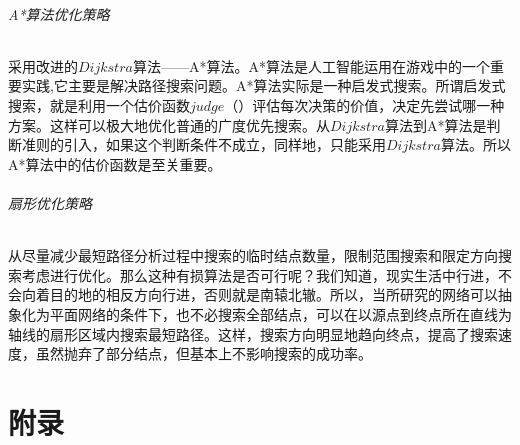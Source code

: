 \documentclass[a4paper,10pt]{ctexart}
\begin{document}
\paragraph{A*算法优化策略}
采用改进的$Dijkstra$算法——A*算法。A*算法是人工智能运用在游戏中的一个重要实践,它主要是解决路径搜索问题。A*算法实际是一种启发式搜索。所谓启发式搜索，就是利用一个估价函数$judge（）$评估每次决策的价值，决定先尝试哪一种方案。这样可以极大地优化普通的广度优先搜索。从$Dijkstra$算法到A*算法是判断准则的引入，如果这个判断条件不成立，同样地，只能采用$Dijkstra$算法。所以A*算法中的估价函数是至关重要。
\paragraph{扇形优化策略}
从尽量减少最短路径分析过程中搜索的临时结点数量，限制范围搜索和限定方向搜索考虑进行优化。那么这种有损算法是否可行呢？我们知道，现实生活中行进，不会向着目的地的相反方向行进，否则就是南辕北辙。所以，当所研究的网络可以抽象化为平面网络的条件下，也不必搜索全部结点，可以在以源点到终点所在直线为轴线的扇形区域内搜索最短路径。这样，搜索方向明显地趋向终点，提高了搜索速度，虽然抛弃了部分结点，但基本上不影响搜索的成功率。

\newpage
\appendix
\part{附录}
\end{document}
